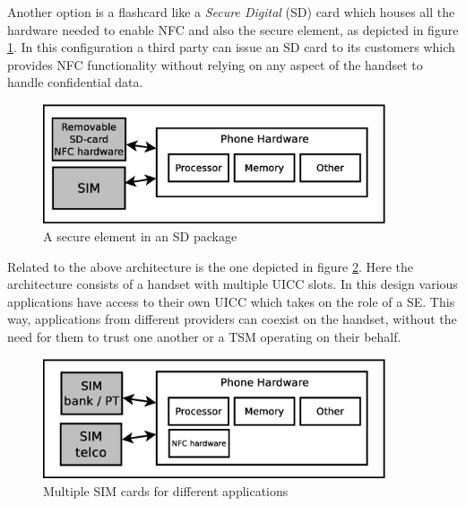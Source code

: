 \begin{enumerate}
\begin{item}
Another option is a flashcard like a \textit{Secure Digital} (SD) card which houses all the hardware needed to enable NFC and also the secure element, as depicted in figure \ref{fig:modular_se}.
In this configuration a third party can issue an SD card to its customers which provides NFC functionality without relying on any aspect of the handset to handle confidential data.
\begin{figure}
\includegraphics[width=0.9\textwidth]{images/SD_NFC}
\caption[SE in SD package]
{
A secure element in an SD package
}
\label{fig:modular_se}
\end{figure}
\end{item}

\begin{item}
Related to the above architecture is the one depicted in figure \ref{fig:multi_sim}.
Here the architecture consists of a handset with multiple UICC slots.
In this design various applications have access to their own UICC which takes on the role of a SE.
This way, applications from different providers can coexist on the handset, without the need for them to trust one another or a TSM operating on their behalf. %
\begin{figure}
\includegraphics[width=0.9\textwidth]{images/meerdere_sims}
\caption[Multiple SIM cards]
{
Multiple SIM cards for different applications
}
\label{fig:multi_sim}
\end{figure}
\end{item}


\end{enumerate}
